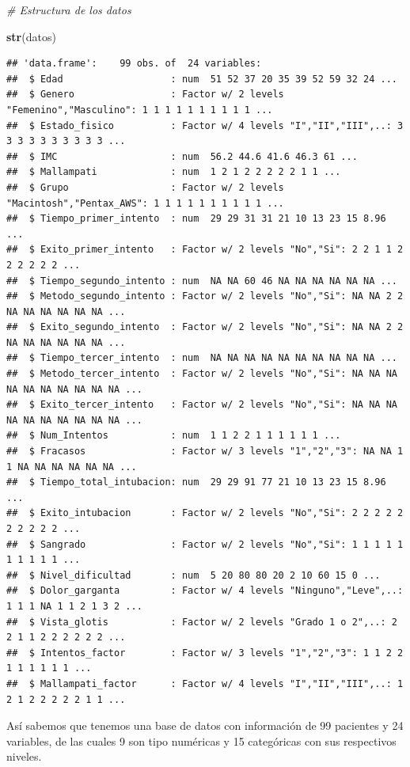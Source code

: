 \documentclass[
]{article}
\newenvironment{Shaded}{\begin{snugshade}}{\end{snugshade}}
\newcommand{\CommentTok}[1]{\textcolor[rgb]{0.56,0.35,0.01}{\textit{#1}}}
\newcommand{\FunctionTok}[1]{\textcolor[rgb]{0.13,0.29,0.53}{\textbf{#1}}}
\newcommand{\NormalTok}[1]{#1}
\begin{document}
\begin{Shaded}
\begin{Highlighting}[]
\CommentTok{\# Estructura de los datos}

\FunctionTok{str}\NormalTok{(datos)}
\end{Highlighting}
\end{Shaded}

\begin{verbatim}
## 'data.frame':    99 obs. of  24 variables:
##  $ Edad                   : num  51 52 37 20 35 39 52 59 32 24 ...
##  $ Genero                 : Factor w/ 2 levels "Femenino","Masculino": 1 1 1 1 1 1 1 1 1 1 ...
##  $ Estado_fisico          : Factor w/ 4 levels "I","II","III",..: 3 3 3 3 3 3 3 3 3 3 ...
##  $ IMC                    : num  56.2 44.6 41.6 46.3 61 ...
##  $ Mallampati             : num  1 2 1 2 2 2 2 2 1 1 ...
##  $ Grupo                  : Factor w/ 2 levels "Macintosh","Pentax_AWS": 1 1 1 1 1 1 1 1 1 1 ...
##  $ Tiempo_primer_intento  : num  29 29 31 31 21 10 13 23 15 8.96 ...
##  $ Exito_primer_intento   : Factor w/ 2 levels "No","Si": 2 2 1 1 2 2 2 2 2 2 ...
##  $ Tiempo_segundo_intento : num  NA NA 60 46 NA NA NA NA NA NA ...
##  $ Metodo_segundo_intento : Factor w/ 2 levels "No","Si": NA NA 2 2 NA NA NA NA NA NA ...
##  $ Exito_segundo_intento  : Factor w/ 2 levels "No","Si": NA NA 2 2 NA NA NA NA NA NA ...
##  $ Tiempo_tercer_intento  : num  NA NA NA NA NA NA NA NA NA NA ...
##  $ Metodo_tercer_intento  : Factor w/ 2 levels "No","Si": NA NA NA NA NA NA NA NA NA NA ...
##  $ Exito_tercer_intento   : Factor w/ 2 levels "No","Si": NA NA NA NA NA NA NA NA NA NA ...
##  $ Num_Intentos           : num  1 1 2 2 1 1 1 1 1 1 ...
##  $ Fracasos               : Factor w/ 3 levels "1","2","3": NA NA 1 1 NA NA NA NA NA NA ...
##  $ Tiempo_total_intubacion: num  29 29 91 77 21 10 13 23 15 8.96 ...
##  $ Exito_intubacion       : Factor w/ 2 levels "No","Si": 2 2 2 2 2 2 2 2 2 2 ...
##  $ Sangrado               : Factor w/ 2 levels "No","Si": 1 1 1 1 1 1 1 1 1 1 ...
##  $ Nivel_dificultad       : num  5 20 80 80 20 2 10 60 15 0 ...
##  $ Dolor_garganta         : Factor w/ 4 levels "Ninguno","Leve",..: 1 1 1 NA 1 1 2 1 3 2 ...
##  $ Vista_glotis           : Factor w/ 2 levels "Grado 1 o 2",..: 2 2 1 1 2 2 2 2 2 2 ...
##  $ Intentos_factor        : Factor w/ 3 levels "1","2","3": 1 1 2 2 1 1 1 1 1 1 ...
##  $ Mallampati_factor      : Factor w/ 4 levels "I","II","III",..: 1 2 1 2 2 2 2 2 1 1 ...
\end{verbatim}

Así sabemos que tenemos una base de datos con información de 99
pacientes y 24 variables, de las cuales 9 son tipo numéricas y 15
categóricas con sus respectivos niveles.
\end{document}
